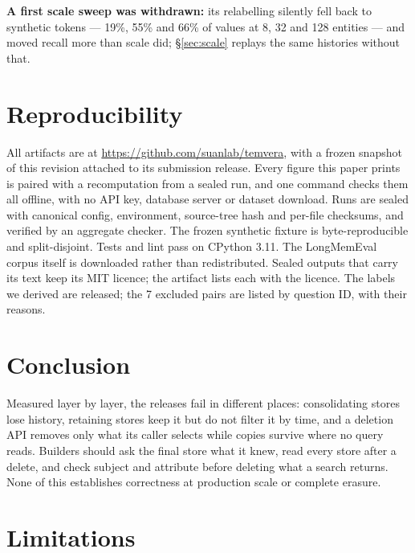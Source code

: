 \documentclass[conference]{IEEEtran}
\begin{document}
\textbf{A first scale sweep was withdrawn:} its relabelling silently fell back to synthetic tokens --- 19\%, 55\%
and 66\% of values at 8, 32 and 128 entities --- and moved recall more than
scale did; \S\ref{sec:scale} replays the same histories without that.

\section{Reproducibility}

All artifacts are at \url{https://github.com/suanlab/temvera}, with a frozen
snapshot of this revision attached to its submission release. Every figure this
paper prints is paired with a recomputation from a sealed run, and one command
checks them all offline, with no API key, database server or dataset download.
Runs are sealed
with canonical config, environment, source-tree hash and per-file checksums, and
verified by an aggregate checker. The frozen synthetic
fixture is byte-reproducible and split-disjoint. Tests and lint pass on CPython
3.11. The LongMemEval corpus itself is downloaded rather than redistributed.
Sealed outputs that carry its text keep its MIT licence; the artifact lists
each with the licence. The labels we derived are released; the 7 excluded pairs
are listed by question ID, with their reasons.

\section{Conclusion}

Measured layer by layer, the releases fail in different places: consolidating
stores lose history, retaining stores keep it but do not filter it by time, and
a deletion API removes only what its caller selects while copies survive where
no query reads. Builders should ask the final store what it knew, read every
store after a delete, and check subject and attribute before deleting what a
search returns. None of this establishes correctness at production scale or
complete erasure.

\section*{Limitations}
\end{document}
